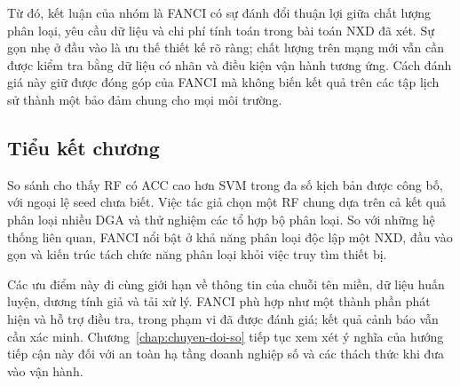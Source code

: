 Từ đó, kết luận của nhóm là FANCI có sự đánh đổi thuận lợi giữa chất lượng phân loại, yêu cầu dữ liệu và chi phí tính toán trong bài toán NXD đã xét. Sự gọn nhẹ ở đầu vào là ưu thế thiết kế rõ ràng; chất lượng trên mạng mới vẫn cần được kiểm tra bằng dữ liệu có nhãn và điều kiện vận hành tương ứng. Cách đánh giá này giữ được đóng góp của FANCI mà không biến kết quả trên các tập lịch sử thành một bảo đảm chung cho mọi môi trường.

\subsection{Tiểu kết chương}

So sánh cho thấy RF có ACC cao hơn SVM trong đa số kịch bản được công bố, với ngoại lệ seed chưa biết. Việc tác giả chọn một RF chung dựa trên cả kết quả phân loại nhiều DGA và thử nghiệm các tổ hợp bộ phân loại. So với những hệ thống liên quan, FANCI nổi bật ở khả năng phân loại độc lập một NXD, đầu vào gọn và kiến trúc tách chức năng phân loại khỏi việc truy tìm thiết bị.

Các ưu điểm này đi cùng giới hạn về thông tin của chuỗi tên miền, dữ liệu huấn luyện, dương tính giả và tải xử lý. FANCI phù hợp như một thành phần phát hiện và hỗ trợ điều tra, trong phạm vi đã được đánh giá; kết quả cảnh báo vẫn cần xác minh. Chương~\ref{chap:chuyen-doi-so} tiếp tục xem xét ý nghĩa của hướng tiếp cận này đối với an toàn hạ tầng doanh nghiệp số và các thách thức khi đưa vào vận hành.
